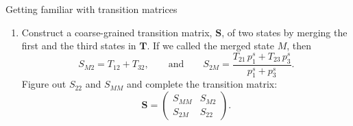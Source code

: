 \documentclass[12pt]{article}
\begin{document}
\begin{problem}{Getting familiar with transition matrices}
\begin{enumerate}
  \item
  \label{prob1:coarsegraining}
  Construct a coarse-grained transition matrix, $\mathbf S$,
  of two states by merging the first and the third states
  in $\mathbf T$. If we called the merged state $M$, then
  \begin{equation}
  S_{M2} = T_{12} + T_{32},
  \qquad \mathrm{and} \qquad
  S_{2M} =
  \frac{ T_{21} \, p^s_1 + T_{23} \, p^s_3 }
       { p^s_1 + p^s_3 }
  .
  \label{eq:coarse-graining}
  \end{equation}
  Figure out $S_{22}$ and $S_{MM}$
  and complete the transition matrix:
  $$
  \mathbf S
  =
  \left(
    \begin{array}{rr}
      S_{MM}    &   S_{M2} \\
      S_{2M}    &   S_{22}
    \end{array}
  \right).
  $$

%
%


\end{enumerate}

\end{problem}
\end{document}
